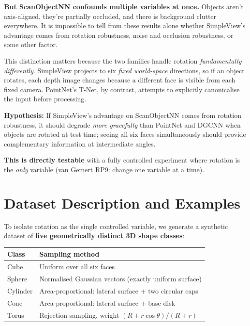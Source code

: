 \documentclass[12pt,a4paper]{article}
\begin{document}
\medskip
\noindent\textbf{But ScanObjectNN confounds multiple variables at once.} Objects aren't axis-aligned, they're partially occluded, and there is background clutter everywhere. It is impossible to tell from these results alone whether SimpleView's advantage comes from rotation robustness, noise and occlusion robustness, or some other factor.

\medskip
This distinction matters because the two families handle rotation \emph{fundamentally differently}. SimpleView projects to six \emph{fixed world-space} directions, so if an object rotates, each depth image changes because a different face is visible from each fixed camera. PointNet's T-Net, by contrast, attempts to explicitly canonicalise the input before processing.

\begin{hypothesisbox}
\textbf{Hypothesis:} If SimpleView's advantage on ScanObjectNN comes from rotation robustness, it should degrade \emph{more gracefully} than PointNet and DGCNN when objects are rotated at test time; seeing all six faces simultaneously should provide complementary information at intermediate angles.

\medskip
\textbf{This is directly testable} with a fully controlled experiment where rotation is the \emph{only} variable (van Gemert RP9: change one variable at a time).
\end{hypothesisbox}

\section{Dataset Description and Examples}

To isolate rotation as the single controlled variable, we generate a synthetic dataset of \textbf{five geometrically distinct 3D shape classes}:

\begin{center}
\begin{tabular}{ll}
\toprule
\textbf{Class} & \textbf{Sampling method} \\
\midrule
Cube     & Uniform over all six faces \\
Sphere   & Normalised Gaussian vectors (exactly uniform surface) \\
Cylinder & Area-proportional: lateral surface $+$ two circular caps \\
Cone     & Area-proportional: lateral surface $+$ base disk \\
Torus    & Rejection sampling, weight $(R + r\cos\theta)/(R+r)$ \\
\bottomrule
\end{tabular}
\end{center}
\end{document}
